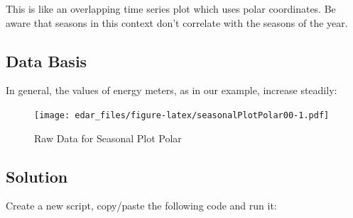 \documentclass[
]{book}
\begin{document}
This is like an overlapping time series plot which uses polar coordinates. Be aware that seasons in this context don't correlate with the seasons of the year.

\hypertarget{data-basis-2}{%
\subsection{Data Basis}\label{data-basis-2}}

In general, the values of energy meters, as in our example, increase steadily:

\begin{figure}
\centering
\texttt{[image: edar\_files/figure-latex/seasonalPlotPolar00-1.pdf]}
\caption{\label{fig:seasonalPlotPolar00}Raw Data for Seasonal Plot Polar}
\end{figure}

\hypertarget{solution-2}{%
\subsection{Solution}\label{solution-2}}

Create a new script, copy/paste the following code and run it:
\end{document}
